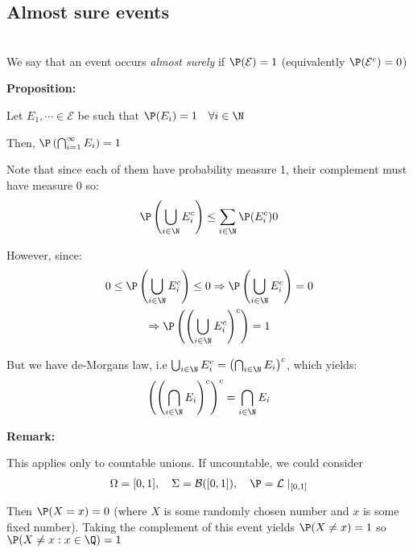 \subsection{Almost sure events}\hfill\\
\noindent We say that an event occurs \textit{almost surely} if $\P(\mathcal{E}) = 1$ (equivalently $\P(\mathcal{E}^c) = 0$)
\par\bigskip
\noindent\textbf{Proposition:}\par
\noindent Let $E_1,\cdots\in\mathcal{E}$ be such that $\P(E_i) = 1\quad\forall i\in\N$\par
\noindent Then, $\P\left(\bigcap_{i=1}^{\infty}E_i\right) = 1$
\par\bigskip
\begin{prf}[]{}
  Note that since each of them have probability measure 1, their complement must have measure 0 so:
  \begin{equation*}
    \begin{gathered}
      \P\left(\bigcup_{i\in\N}E_i^c\right)\leq\sum_{i\in\N}\P(E_i^c) 0
    \end{gathered}
  \end{equation*}\par
  \noindent However, since:
  \begin{equation*}
    \begin{gathered}
      0\leq\P\left(\bigcup_{i\in\N}E_i^c\right)\leq0\Rightarrow \P\left(\bigcup_{i\in\N}E_i^c\right) = 0\\
      \Rightarrow\P\left(\left(\bigcup_{i\in\N}E_i^c\right)^c\right) =1
    \end{gathered}
  \end{equation*}\par
  \noindent But we have de-Morgans law, i.e $\bigcup_{i\in\N}E_i^c = \left(\bigcap_{i\in\N}E_i\right)^c$, which yields:
  \begin{equation*}
    \begin{gathered}
      \left(\left(\bigcap_{i\in\N}E_i\right)^c\right)^c = \bigcap_{i\in\N}E_i
    \end{gathered}
  \end{equation*}
\end{prf}
\par\bigskip
\noindent\textbf{Remark:}\par
\noindent This applies only to countable unions. If uncountable, we could consider 
\begin{equation*}
  \begin{gathered}
    \Omega = [0,1],\quad\Sigma = \mathcal{B}([0,1]),\quad\P=\mathcal{L}\mid_{[0,1]}
  \end{gathered}
\end{equation*}\par
\noindent Then $\P(X = x) = 0$ (where $X$ is some randomly chosen number and $x$ is some fixed number). Taking the complement of this event yields $\P(X\neq x) = 1$ so $\P(X\neq x:x\in\Q) = 1$
\par\bigskip
